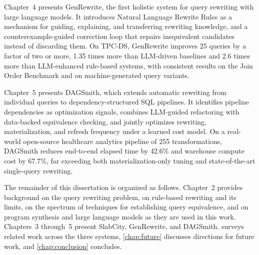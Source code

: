 Chapter~4 presents GenRewrite, the first holistic system for query
rewriting with large language models. It introduces Natural Language
Rewrite Rules as a mechanism for guiding, explaining, and transferring
rewriting knowledge, and a counterexample-guided correction loop that
repairs inequivalent candidates instead of discarding them. On TPC-DS,
GenRewrite improves 25 queries by a factor of two or more, 1.35 times
more than LLM-driven baselines and 2.6 times more than LLM-enhanced
rule-based systems, with consistent results on the Join Order Benchmark
and on machine-generated query variants.

Chapter~5 presents DAGSmith, which extends automatic rewriting from
individual queries to dependency-structured SQL pipelines. It
identifies pipeline dependencies as optimization signals, combines
LLM-guided refactoring with data-backed equivalence checking, and
jointly optimizes rewriting, materialization, and refresh frequency
under a learned cost model. On a real-world open-source healthcare
analytics pipeline of 255 transformations, DAGSmith reduces end-to-end
elapsed time by 42.6\% and warehouse compute cost by 67.7\%, far
exceeding both materialization-only tuning and state-of-the-art
single-query rewriting.

The remainder of this dissertation is organized as follows.
Chapter~2 provides background on the query rewriting problem, on
rule-based rewriting and its limits, on the spectrum of techniques for
establishing query equivalence, and on program synthesis and large
language models as they are used in this work. Chapters~3 through~5
present SlabCity, GenRewrite, and DAGSmith. 
surveys related work across the three systems,
\cref{chap:future} discusses directions for future work, and
\cref{chap:conclusion} concludes.














